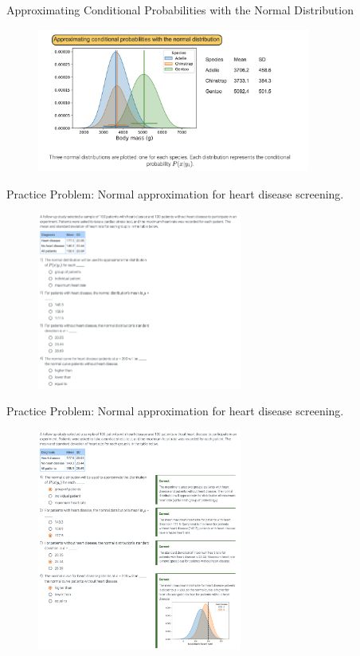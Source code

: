\documentclass[10pt,dvipsnames]{beamer}
\begin{document}
\begin{frame}{Approximating Conditional Probabilities with the Normal Distribution}
	\begin{figure}[ht]
		\centering
		\includegraphics[width=0.8\textwidth]{imgs/nb_23.png}
	\end{figure}
\end{frame}

\begin{frame}{Practice Problem: Normal approximation for heart disease screening.}
		\begin{figure}[ht]
		\centering
		\includegraphics[width=0.6\textwidth]{imgs/nb_24.png}
	\end{figure}
\end{frame}

\begin{frame}{Practice Problem: Normal approximation for heart disease screening.}
	\begin{figure}[ht]
		\centering
		\includegraphics[width=0.6\textwidth]{imgs/nb_25.png}
	\end{figure}
\end{frame}
\end{document}
